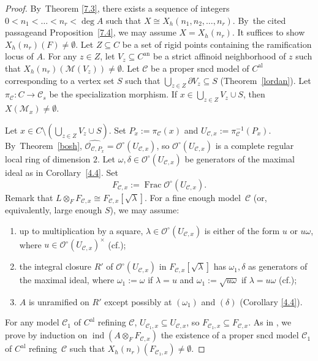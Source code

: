 \documentclass[10pt]{amsart}
\newcommand{\cf}{cf.}
\newcommand{\loccit}{the cited passage}
\newenvironment{enumeratea}
{\bgroup\def\theenumi{\alph{enumi}}\begin{enumerate}}
{\end{enumerate}\egroup}
\newcommand{\al}{\mathrm{al}}
\DeclareMathOperator{\Frac}{Frac}
\DeclareMathOperator{\ind}{ind}
\let\backslash\setminus
\theoremstyle{definition}
\begin{document}
\begin{proof} By~Theorem \ref{7.3}, there exists a sequence of integers $0< n_1< \dots < n_r < \deg{A}$ such that $X \cong X_h(n_1, n_2, \dots, n_r)$. By~\loccit and Proposition~\ref{7.4}, we may assume $X=X_h(n_r)$. It suffices to show $X_h(n_r)(F) \neq \emptyset$.
Let $Z \subseteq C$ be a set of rigid points containing the ramification locus of $A$. For any $z \in Z$, let $V_z \subseteq C^{\mathrm{an}}$ be a strict affinoid neighborhood of $z$ such that $X_h(n_r)(\mathscr{M}(V_z)) \neq \emptyset$. Let $\mathscr{C}$ be a proper sncd model of $C^{\al}$ corresponding to a vertex set $S$ such that $\bigcup_{z \in Z} \partial{V_z} \subseteq S$ (Theorem~\ref{lordan}). Let $\pi_{\mathscr{C}}: C \to \mathscr{C}_s$ be the specialization morphism. If $x \in \bigcup_{z \in Z} V_z \cup S$, then $X(\mathscr{M}_x)\neq \emptyset$.

Let $x \in C \backslash (\bigcup_{z \in Z} V_z \cup S)$. Set $P_x:=\pi_{\mathscr{C}}(x)$ and $U_{\mathscr{C},x}:=\pi_{\mathscr{C}}^{-1}(P_x)$. By~Theorem~\ref{bosh}, $\widehat{\mathcal{O}_{\mathscr{C}, P_x}}=\mathcal{O}^{\circ}(U_{\mathscr{C},x})$, so $\mathcal{O}^{\circ}(U_{\mathscr{C},x})$ is a complete regular local ring of dimension $2$. Let $\omega, \delta \in \mathcal{O}^{\circ}(U_{\mathscr{C},x})$ be generators of the maximal ideal as in Corollary~\ref{4.4}. Set
\[
F_{\mathscr{C},x}:=\Frac \mathcal{O}^{\circ}(U_{\mathscr{C},x}).
\]
Remark that $L \otimes_F F_{\mathscr{C},x} \cong F_{\mathscr{C},x}[\sqrt{\lambda}]$. For a fine enough model~$\mathscr{C}$ (or, equivalently, large enough $S$), we may assume:
\begin{enumeratea}
\item\label{enum:a}
up to multiplication by a square, $\lambda \in \mathcal{O}^{\circ}(U_{\mathscr{C},x})$ is either of the form $u$ or $u \omega$, where $u \in \mathcal{O}^{\circ}(U_{\mathscr{C},x})^{\times}$ (\cf \cite[Lem.\,4.2]{wu});
\item\label{enum:b}
the integral closure $R'$ of $\mathcal{O}^{\circ}(U_{\mathscr{C},x})$ in $F_{\mathscr{C},x}[\sqrt{\lambda}]$ has $\omega_1, \delta$ as generators of the maximal ideal, where $\omega_1:=\omega$ if $\lambda=u$ and $\omega_1:=\sqrt{u \omega}$ if $\lambda=u\omega$ (\cf \cite[\S 9]{parsur});
\item\label{enum:c}
$A$ is unramified on $R'$ except possibly at $(\omega_1)$ and $(\delta)$ (Corollary \ref{4.4}).
\end{enumeratea}
For any model $\mathscr{C}_1$ of $C^{\al}$ refining $\mathscr{C}$, $U_{{\mathscr{C}_1,x}} \subseteq U_{\mathscr{C},x}$, so $F_{\mathscr{C}_1,x} \subseteq F_{\mathscr{C},x}$.
As in \cite[Th.\,12.2]{parsur}, we prove by induction on $\ind(A \otimes_F F_{\mathscr{C},x})$ the existence of a proper sncd model $\mathscr{C}_1$ of $C^{\al}$ refining~$\mathscr{C}$ such that $X_h(n_r)(F_{\mathscr{C}_1,x}) \neq \emptyset$.


\end{proof}
\end{document}
